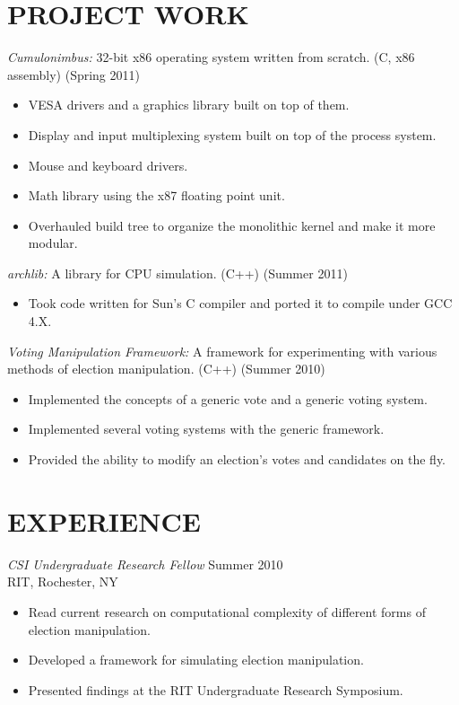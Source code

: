 \documentclass[margin]{res}
\begin{document}
\begin{resume}
\section{PROJECT WORK}
                 {\sl Cumulonimbus:} 32-bit x86 operating system written from scratch. (C, x86 assembly) (Spring 2011)
                 \begin{itemize} \itemsep -2pt
                    \item VESA drivers and a graphics library built on top of them.
                    \item Display and input multiplexing system built on top of the process system.
                    \item Mouse and keyboard drivers.
                    \item Math library using the x87 floating point unit.
                    \item Overhauled build tree to organize the monolithic kernel and make it more modular.
                  \end{itemize}

                  {\sl archlib:} A library for CPU simulation. (C++) (Summer 2011)
                  \begin{itemize} \itemsep -2pt
                    \item Took code written for Sun's C compiler and ported it to compile under GCC 4.X.
                  \end{itemize}

                  {\sl Voting Manipulation Framework:} A framework for experimenting with various methods of election manipulation. (C++) (Summer 2010)
                  \begin{itemize} \itemsep -2pt
                    \item Implemented the concepts of a generic vote and a generic voting system.
                    \item Implemented several voting systems with the generic framework.
                    \item Provided the ability to modify an election's votes and candidates on the fly. 
                  \end{itemize}
                    
\section{EXPERIENCE} {\sl CSI Undergraduate Research Fellow} \hfill            Summer 2010 \\
                 RIT, Rochester, NY
                 \begin{itemize}  \itemsep -2pt %
                    \item Read current research on computational complexity of different forms of election manipulation.
                    \item Developed a framework for simulating election manipulation.
                    \item Presented findings at the RIT Undergraduate Research Symposium.
                \end{itemize}
 

\end{resume}
\end{document}
